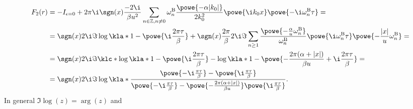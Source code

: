 \documentclass[english, parskip=full]{scrartcl}
\newcommand{\B}{\text{B}}
\begin{document}
\begin{align}
F_2(r) &= -I_{\epsilon = 0} + 2\pi\i \sgn(x) \frac{-2\i}{\beta u^2} \sum_{n\in\mathbb{Z},n\neq 0} \omega_n^\B \frac{\powe{-\alpha|k_0|}}{2k_0^2} \powe{\i k_0x} \powe{-\i \omega_n^\B\tau} = \\
&= \sgn(x) 2\i\Im \log \kla*{1 - \powe{\i \frac{2\pi\tau}{\beta}}} + \sgn(x) \frac{2\pi}{\beta} 2\i\Im\sum_{n\ge 1} \frac{\powe{-\frac{\alpha}{u} \omega_n^\B}}{\omega_n^\B} \powe{\i\omega_n^\B\tau} \powe{-\frac{|x|}{u} \omega_n^\B} = \\
&= \sgn(x) 2\i\Im\klc*{\log \kla*{1 - \powe{\i\frac{2\pi\tau}{\beta}}} - \log \kla*{1 - \powe{-\frac{2\pi(\alpha + |x|)}{\beta u} + \i\frac{2\pi\tau}{\beta}}}  } = \\
&= \sgn(x) 2\i \Im \log \kla*{\frac{\powe{-\i\frac{\pi\tau}{\beta}} - \powe{\i \frac{\pi\tau}{\beta}} }{ \powe{-\i\frac{\pi\tau}{\beta}} - \powe{-\frac{2\pi(\alpha + |x|)}{\beta u}} \powe{\i \frac{\pi\tau}{\beta}} }}.
\end{align}
In general $\Im\log (z) = \arg(z)$ and 
\end{document}
